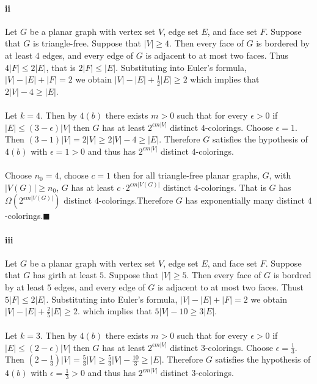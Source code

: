 \documentclass[letterpaper,12pt,oneside,onecolumn]{report}
\begin{document}
\paragraph{ii}
Let $G$ be a planar graph with vertex set $V$, edge set $E$, and face set $F$. Suppose that $G$ is triangle-free. Suppose that $|V| \geq 4$. Then every face of $G$ is bordered by at least $4$ edges, and every edge of $G$ is adjacent to at most two faces. Thus $4|F| \leq 2|E|$, that is $2|F| \leq |E|$. Substituting into Euler's formula, $|V| - |E| + |F| = 2$ we obtain $|V| - |E| + \frac{1}{2} |E| \geq 2$ which implies that $2|V| - 4 \geq |E|$.
\paragraph{}
Let $k = 4$. Then by $4(b)$ there exists $m > 0$ such that for every $\epsilon > 0 $ if $|E| \leq (3 - \epsilon)|V|$ then $G$ has at least $2^{\epsilon m |V|}$ distinct $4$-colorings. Choose $\epsilon = 1$. Then $(3 - 1)|V| = 2|V| \geq 2|V| - 4 \geq |E|$. Therefore $G$ satisfies the hypothesis of $4(b)$ with $\epsilon = 1 > 0$ and thus has $2^{\epsilon m |V|}$ distinct $4$-colorings.
\paragraph{}
Choose $n_0 = 4$, choose $c = 1$ then for all triangle-free planar graphs, $G$, with $|V(G)| \geq n_0$, $G$ has at least $c \cdot 2^{\epsilon m |V(G)|}$ distinct $4$-colorings. That is $G$ has $\Omega(2^{\epsilon m |V(G)|})$ distinct $4$-colorings.Therefore $G$ has exponentially many distinct $4$-colorings.$\blacksquare$
\paragraph{iii}
Let $G$ be a planar graph with vertex set $V$, edge set $E$, and face set $F$. Suppose that $G$ has girth at least $5$. Suppose that $|V| \geq 5$. Then every face of $G$ is bordred by at least $5$ edges, and every edge of $G$ is adjacent to at most two faces. Thust $5|F| \leq 2|E|$. Substituting into Euler's formula, $|V| - |E| + |F| = 2$ we obtain $|V| - |E| + \frac{2}{5}|E| \geq 2$. which implies that $5|V| - 10 \geq 3|E|$. 
\paragraph{}
Let $k = 3$. Then by $4(b)$ there exists $m > 0$ such that for every $\epsilon > 0$ if $|E| \leq (2 - \epsilon)|V|$ then $G$ has at least $2^{\epsilon m |V|}$ distinct $3$-colorings. Choose $\epsilon = \frac{1}{3}$. Then $(2 - \frac{1}{3})|V| = \frac{5}{3}|V| \geq \frac{5}{3}|V| - \frac{10}{3} \geq |E|$. Therefore $G$ satisfies the hypothesis of $4(b)$ with $\epsilon = \frac{1}{3} > 0$ and thus has $2^{\epsilon m |V|}$ distinct $3$-colorings.
\end{document}
